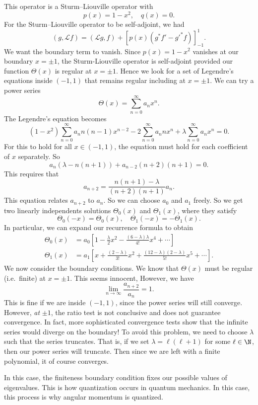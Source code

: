 \documentclass[a4paper]{article}
\begin{document}
This operator is a Sturm--Liouville operator with
\[
  p(x) = 1 - x^2,\quad q(x) = 0.
\]
For the Sturm--Liouville operator to be self-adjoint, we had
\[
  (g, \mathcal{L} f) = (\mathcal{L}g, f) + [p(x) (g^* f' - g'^* f)]^{1}_{-1}.
\]
We want the boundary term to vanish. Since $p(x) = 1- x^2$ vanishes at our boundary $x = \pm 1$, the Sturm-Liouville operator is self-adjoint provided our function $\Theta(x)$ is regular at $x = \pm 1$. Hence we look for a set of Legendre's equations inside $(-1, 1)$ that remains regular including at $x = \pm 1$. We can try a power series
\[
  \Theta(x) = \sum_{n = 0}^\infty a_n x^n.
\]
The Legendre's equation becomes
\[
  (1 - x^2) \sum_{n = 0}^\infty a_n n(n - 1)x^{n - 2} - 2\sum_{n = 0}^\infty a_n nx^n + \lambda \sum_{n = 0}^\infty a_n x^n = 0.
\]
For this to hold for all $x\in (-1, 1)$, the equation must hold for each coefficient of $x$ separately. So
\[
  a_n(\lambda - n(n + 1)) + a_{n - 2}(n + 2)(n + 1) = 0.
\]
This requires that
\[
  a_{n + 2} = \frac{n(n + 1) - \lambda}{(n + 2)(n + 1)} a_n.
\]
This equation relates $a_{n + 2}$ to $a_n$. So we can choose $a_0$ and $a_1$ freely. So we get two linearly independents solutions $\Theta_0(x)$ and $\Theta_1(x)$, where they satisfy
\[
  \Theta_0(-x) = \Theta_0(x), \quad \Theta_1(-x) = -\Theta_1(x).
\]
In particular, we can expand our recurrence formula to obtain
\begin{align*}
  \Theta_0(x) &= a_0 \left[1 - \frac{\lambda}{2} x^2 - \frac{(6 - \lambda)\lambda}{4!}x^4 + \cdots\right]\\
  \Theta_1(x) &= a_1 \left[x + \frac{(2 - \lambda)}{3!}x^2 + \frac{(12 - \lambda)(2 - \lambda)}{5!}x^5 + \cdots\right].
\end{align*}
We now consider the boundary conditions. We know that $\Theta(x)$ must be regular (i.e.\ finite) at $x = \pm 1$. This seems innocent, However, we have
\[
  \lim_{n \to \infty}\frac{a_{n + 2}}{a_n} = 1.
\]
This is fine if we are inside $(-1, 1)$, since the power series will still converge. However, \emph{at} $\pm 1$, the ratio test is not conclusive and does not guarantee convergence. In fact, more sophisticated convergence tests show that the infinite series would diverge on the boundary! To avoid this problem, we need to choose $\lambda$ such that the series truncates. That is, if we set $\lambda = \ell(\ell + 1)$ for some $\ell \in \N$, then our power series will truncate. Then since we are left with a finite polynomial, it of course converges.

In this case, the finiteness boundary condition fixes our possible values of eigenvalues. This is how quantization occurs in quantum mechanics. In this case, this process is why angular momentum is quantized.
\end{document}
